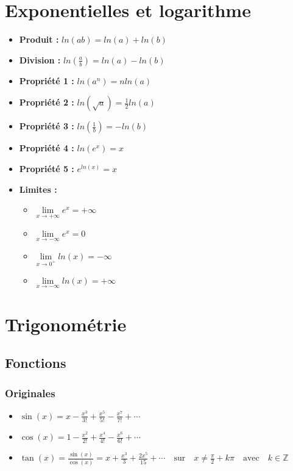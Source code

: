 \documentclass[12]{article}%
\theoremstyle{plain}
\theoremstyle{definition}
\theoremstyle{remark}
\begin{document}
\section{Exponentielles et logarithme}
\large
\begin{itemize}
	\item \textbf{Produit :} \( \boxed{ln(ab) = ln(a) + ln(b)} \)
	\item \textbf{Division :} \( \boxed{ln(\frac{a}{b}) = ln(a) - ln(b)} \)
	\item \textbf{Propriété 1 :} \( \boxed{ln(a^{n}) = nln(a)} \)
	\item \textbf{Propriété 2 :} \( \boxed{ln(\sqrt{a}) = \frac{1}{2}ln(a)} \)
	\item \textbf{Propriété 3 :} \( \boxed{ln(\frac{1}{b}) = -ln(b)} \)
	\item \textbf{Propriété 4 :} \( \boxed{ln(e^{x}) = x} \)
	\item \textbf{Propriété 5 :} \( \boxed{e^{ln(x)} = x} \)
	\item \textbf{Limites :}
	\begin{itemize}
		\item \( \boxed{\lim\limits_{x \to +\infty} e^{x} = +\infty} \)
		\item \( \boxed{\lim\limits_{x \to -\infty} e^{x} = 0} \)
		
		\item \( \boxed{\lim\limits_{x \to 0^{+}} ln(x) = -\infty} \)
		\item \( \boxed{\lim\limits_{x \to -\infty} ln(x) = +\infty} \)
	\end{itemize}
\end{itemize}

\newpage
\section{Trigonométrie}
\large
\subsection{Fonctions}
\subsubsection{Originales}
\begin{itemize}
	\item \( \boxed{\sin(x) = x - \frac{x^3}{3!} + \frac{x^5}{5!} - \frac{x^7}{7!} + \cdots} \)
	\item \( \boxed{\cos(x) = 1 - \frac{x^2}{2!} + \frac{x^4}{4!} - \frac{x^6}{6!} + \cdots} \)
	\item \( \boxed{\tan(x) = \frac{\sin(x)}{\cos(x)} = x + \frac{x^3}{3} + \frac{2x^5}{15} + \cdots} \quad \text{sur} \quad x \neq \frac{\pi}{2} + k\pi \quad \text{avec} \quad k \in \mathbb{Z} \)
\end{itemize}
\end{document}
